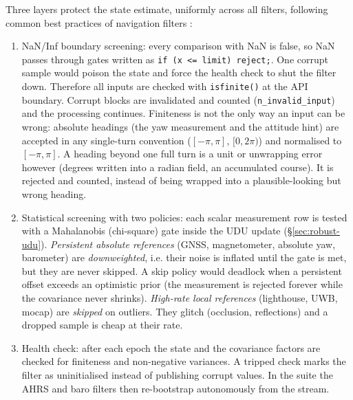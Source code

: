 \documentclass[11pt,a4paper]{article}
\newcommand{\code}[1]{\texttt{#1}}
\begin{document}
Three layers protect the state estimate, uniformly across all filters,
following common best practices of navigation filters \cite{carpenter2018}:

\begin{enumerate}
  \item NaN/Inf boundary screening: every comparison with NaN is false, so NaN
        passes through gates written as \code{if (x <= limit) reject;}. One
        corrupt sample would poison the state and force the health check to
        shut the filter down. Therefore all inputs are checked with
        \code{isfinite()} at the API boundary. Corrupt blocks are invalidated
        and counted (\code{n\_\allowbreak{}invalid\_\allowbreak{}input}) and the
        processing continues. Finiteness is not the only way an input can be
        wrong: absolute headings (the yaw measurement and the attitude hint) are
        accepted in any single-turn convention ($[-\pi,\pi]$, $[0,2\pi)$) and
        normalised to $[-\pi,\pi]$. A heading beyond one full turn is a unit or
        unwrapping error however (degrees written into a radian field, an
        accumulated course). It is rejected and counted, instead of being
        wrapped into a plausible-looking but wrong heading.
  \item Statistical screening with two policies: each scalar measurement row is
        tested with a Mahalanobis (chi-square) gate inside the UDU update
        (\S\ref{sec:robust-udu}). \emph{Persistent absolute references} (GNSS,
        magnetometer, absolute yaw, barometer) are \emph{downweighted}, i.e.
        their noise is inflated until the gate is met, but they are never
        skipped. A skip policy would deadlock when a persistent offset exceeds
        an optimistic prior (the measurement is rejected forever while the
        covariance never shrinks). \emph{High-rate local references}
        (lighthouse, UWB, mocap) are \emph{skipped} on outliers. They glitch
        (occlusion, reflections) and a dropped sample is cheap at their rate.
  \item Health check: after each epoch the state and the covariance factors are
        checked for finiteness and non-negative variances. A tripped check marks
        the filter as uninitialised instead of publishing corrupt values. In the
        suite the AHRS and baro filters then re-bootstrap autonomously from the
        stream.
\end{enumerate}
\end{document}
